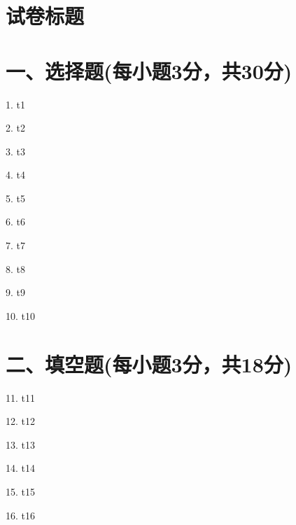 \documentclass[10pt]{article}
\begin{document}
\section*{\centering 试卷标题}
\section*{\normalsize 一、选择题(每小题3分，共30分)}
\begin{markdown}
1. t1


2. t2


3. t3


4. t4


5. t5


6. t6


7. t7


8. t8


9. t9


10. t10


\end{markdown}
\section*{\normalsize 二、填空题(每小题3分，共18分)}
\begin{markdown}
11. t11

12. t12

13. t13

14. t14

15. t15

16. t16

\end{markdown}
\end{document}
